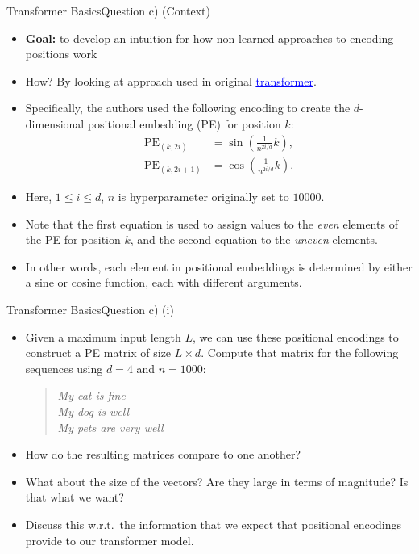 \documentclass[t]{beamer}
\begin{document}
\begin{frame}{Transformer Basics}{Question c) (Context)}
    \begin{itemize}
        \item \textbf{Goal:} to develop an intuition for how
              non-learned approaches to encoding positions work
        \item How? By looking at approach used in original
              \href{https://arxiv.org/pdf/1706.03762.pdf}{\textcolor{blue}{\underline{transformer}}}.
        \item Specifically, the authors used the following encoding to create the
              $d$-dimensional positional embedding (PE) for position $k$:
              \begin{align*}
                  \operatorname{PE}_{(k,2i)}   & = \sin\left(\frac{1}{n^{2i/d}}k\right), \\
                  \operatorname{PE}_{(k,2i+1)} & = \cos\left(\frac{1}{n^{2i/d}}k\right).
              \end{align*}
        \item Here, $1\leq i \leq d$, $n$ is hyperparameter originally
              set to $10000$.
        \item Note that the first equation is used to assign values to the
              \emph{even} elements of the PE for position $k$, and the second 
              equation to the \emph{uneven} elements.
        \item In other words, each element in positional embeddings is
              determined by either a sine or cosine function, each with
              different arguments.
    \end{itemize}
\end{frame}

\begin{frame}{Transformer Basics}{Question c) (i)}
    \begin{itemize}
        \item Given a maximum input length $L$, we can use these positional
              encodings to construct a PE matrix of size $L\times d$.
              Compute that matrix for the following sequences using $d=4$
              and $n=1000$:
              \begin{quote}
                  \emph{My cat is fine} \\
                  \emph{My dog is well} \\
                  \emph{My pets are very well}
              \end{quote}
        \item How do the resulting matrices compare to one another?
        \item What about the size of the vectors? Are they large in terms of
              magnitude? Is that what we want?
        \item Discuss this w.r.t.\ the information that we expect that
              positional encodings provide to our transformer model.
    \end{itemize}
\end{frame}
\end{document}
